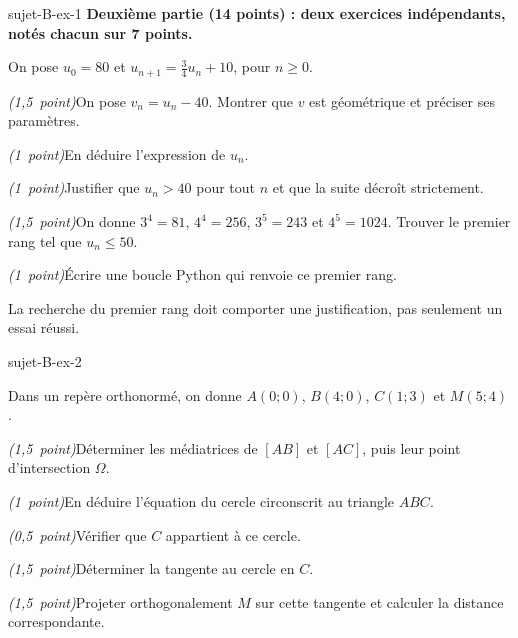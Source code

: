 \begin{blocEdition}{sujet-B-ex-1}
\textbf{Deuxième partie (14 points) : deux exercices indépendants, notés chacun sur 7 points.}
\par\vspace{2mm}
On pose $u_0=80$ et $u_{n+1}=\frac34u_n+10$, pour $n\geq0$.
\begin{questions}
\item \mbox{\textit{(1,5 point)}}\enspace On pose $v_n=u_n-40$. Montrer que $v$ est géométrique et préciser ses paramètres.
\item \mbox{\textit{(1 point)}}\enspace En déduire l'expression de $u_n$.
\item \mbox{\textit{(1 point)}}\enspace Justifier que $u_n>40$ pour tout $n$ et que la suite décroît strictement.
\item \mbox{\textit{(1,5 point)}}\enspace On donne $3^4=81$, $4^4=256$, $3^5=243$ et $4^5=1024$.
Trouver le premier rang tel que $u_n\leq50$.
\item \mbox{\textit{(1 point)}}\enspace Écrire une boucle Python qui renvoie ce premier rang.
\end{questions}
La recherche du premier rang doit comporter une justification, pas seulement un essai réussi.

\end{blocEdition}

\begin{blocEdition}{sujet-B-ex-2}

Dans un repère orthonormé, on donne $A(0;0)$, $B(4;0)$, $C(1;3)$ et $M(5;4)$.
\begin{questions}
\item \mbox{\textit{(1,5 point)}}\enspace Déterminer les médiatrices de $[AB]$ et $[AC]$, puis leur point d'intersection $\Omega$.
\item \mbox{\textit{(1 point)}}\enspace En déduire l'équation du cercle circonscrit au triangle $ABC$.
\item \mbox{\textit{(0,5 point)}}\enspace Vérifier que $C$ appartient à ce cercle.
\item \mbox{\textit{(1,5 point)}}\enspace Déterminer la tangente au cercle en $C$.
\item \mbox{\textit{(1,5 point)}}\enspace Projeter orthogonalement $M$ sur cette tangente et calculer la distance correspondante.
\end{questions}

\label{figedition-sujet-B-ex-2-1}
\end{blocEdition}

